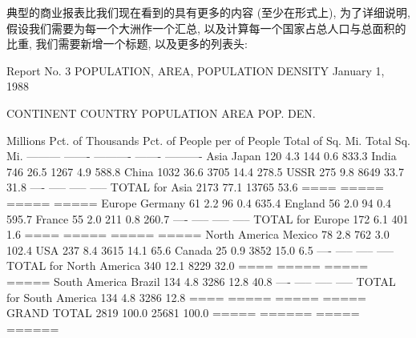 典型的商业报表比我们现在看到的具有更多的内容 (至少在形式上), 为了详细说明,
假设我们需要为每一个大洲作一个汇总, 以及计算每一个国家占总人口与总面积的
比重, 我们需要新增一个标题, 以及更多的列表头:
{\small
\begin{awkcode}
Report No. 3       POPULATION, AREA, POPULATION DENSITY         January 1, 1988

 CONTINENT      COUNTRY        POPULATION              AREA           POP. DEN.  

                           Millions   Pct. of   Thousands  Pct. of   People per
                           of People   Total    of Sq. Mi.  Total      Sq. Mi. 
                           ---------  -------   ---------- -------   ----------
 Asia           Japan         120        4.3        144       0.6      833.3
                India         746       26.5       1267       4.9      588.8
                China        1032       36.6       3705      14.4      278.5
                USSR          275        9.8       8649      33.7       31.8
                             ----      -----      -----     -----
   TOTAL for Asia            2173       77.1      13765      53.6
                             ====      =====      =====     =====
 Europe         Germany        61        2.2         96       0.4      635.4
                England        56        2.0         94       0.4      595.7
                France         55        2.0        211       0.8      260.7
                             ----      -----      -----     -----
   TOTAL for Europe           172        6.1        401       1.6
                             ====      =====      =====     =====
 North America  Mexico         78        2.8        762       3.0      102.4
                USA           237        8.4       3615      14.1       65.6
                Canada         25        0.9       3852      15.0        6.5
                             ----      -----      -----     -----
   TOTAL for North America    340       12.1       8229      32.0
                             ====      =====      =====     =====
 South America  Brazil        134        4.8       3286      12.8       40.8
                             ----      -----      -----     -----
   TOTAL for South America    134        4.8       3286      12.8
                             ====      =====      =====     =====
 GRAND TOTAL                 2819      100.0      25681     100.0
                            =====     ======      =====    ======
\end{awkcode}
}

